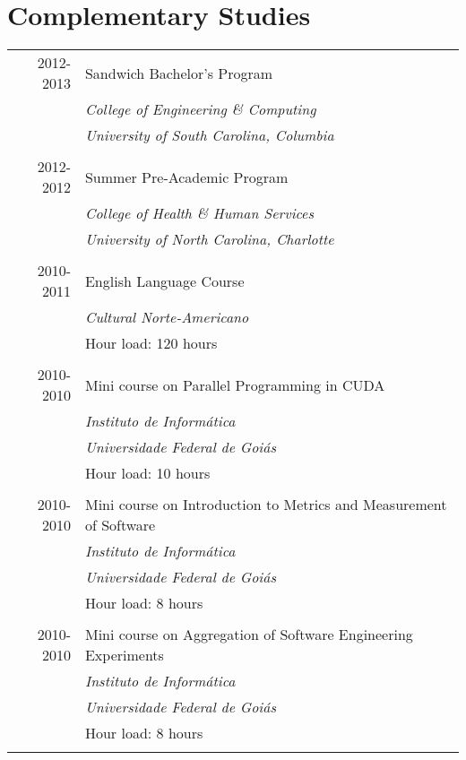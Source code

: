 \documentclass[a4paper,10pt]{article}
\begin{document}
\section{Complementary Studies}
\begin{tabular}{r p{12cm}}	
  \textsc{2012-2013} & Sandwich Bachelor's Program\\ &
  \emph{College of Engineering \& Computing}\\ &
  \emph{University of South Carolina, Columbia}
  \\&\\
  \textsc{2012-2012} & Summer Pre-Academic Program\\ &
  \emph{College of Health \& Human Services}\\ &
  \emph{University of North Carolina, Charlotte}
  \\&\\
  \textsc{2010-2011} & English Language Course\\ &
  \emph{Cultural Norte-Americano} \\ &
  Hour load: 120 hours
  \\&\\
  \textsc{2010-2010} & Mini course on Parallel Programming in CUDA\\ &
  \emph{Instituto de Informática} \\ &
  \emph{Universidade Federal de Goiás}\\ &
  Hour load: 10 hours
  \\&\\
  \textsc{2010-2010} & Mini course on Introduction to Metrics and Measurement of Software\\ &
  \emph{Instituto de Informática} \\ &
  \emph{Universidade Federal de Goiás}\\ &
  Hour load: 8 hours
  \\&\\
  \textsc{2010-2010} & Mini course on Aggregation of Software Engineering Experiments\\ &
  \emph{Instituto de Informática} \\ &
  \emph{Universidade Federal de Goiás}\\ &
  Hour load: 8 hours
  \\&\\
\end{tabular}

\pagebreak
\end{document}
